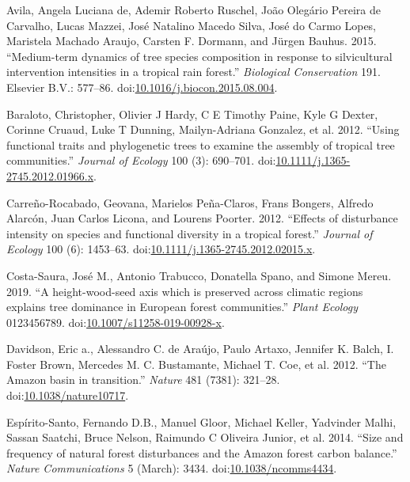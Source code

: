 \documentclass[]{elsarticle} %
\begin{document}
\hypertarget{refs}{}
\hypertarget{ref-DeAvila2015}{}
Avila, Angela Luciana de, Ademir Roberto Ruschel, João Olegário Pereira
de Carvalho, Lucas Mazzei, José Natalino Macedo Silva, José do Carmo
Lopes, Maristela Machado Araujo, Carsten F. Dormann, and Jürgen Bauhus.
2015. ``Medium-term dynamics of tree species composition in response to
silvicultural intervention intensities in a tropical rain forest.''
\emph{Biological Conservation} 191. Elsevier B.V.: 577--86.
doi:\href{https://doi.org/10.1016/j.biocon.2015.08.004}{10.1016/j.biocon.2015.08.004}.

\hypertarget{ref-Baraloto2012a}{}
Baraloto, Christopher, Olivier J Hardy, C E Timothy Paine, Kyle G
Dexter, Corinne Cruaud, Luke T Dunning, Mailyn-Adriana Gonzalez, et al.
2012. ``Using functional traits and phylogenetic trees to examine the
assembly of tropical tree communities.'' \emph{Journal of Ecology} 100
(3): 690--701.
doi:\href{https://doi.org/10.1111/j.1365-2745.2012.01966.x}{10.1111/j.1365-2745.2012.01966.x}.

\hypertarget{ref-Carreno-Rocabado2012}{}
Carreño-Rocabado, Geovana, Marielos Peña-Claros, Frans Bongers, Alfredo
Alarcón, Juan Carlos Licona, and Lourens Poorter. 2012. ``Effects of
disturbance intensity on species and functional diversity in a tropical
forest.'' \emph{Journal of Ecology} 100 (6): 1453--63.
doi:\href{https://doi.org/10.1111/j.1365-2745.2012.02015.x}{10.1111/j.1365-2745.2012.02015.x}.

\hypertarget{ref-Costa-Saura2019}{}
Costa-Saura, José M., Antonio Trabucco, Donatella Spano, and Simone
Mereu. 2019. ``A height-wood-seed axis which is preserved across
climatic regions explains tree dominance in European forest
communities.'' \emph{Plant Ecology} 0123456789.
doi:\href{https://doi.org/10.1007/s11258-019-00928-x}{10.1007/s11258-019-00928-x}.

\hypertarget{ref-Davidson2012}{}
Davidson, Eric a., Alessandro C. de Araújo, Paulo Artaxo, Jennifer K.
Balch, I. Foster Brown, Mercedes M. C. Bustamante, Michael T. Coe, et
al. 2012. ``The Amazon basin in transition.'' \emph{Nature} 481 (7381):
321--28.
doi:\href{https://doi.org/10.1038/nature10717}{10.1038/nature10717}.

\hypertarget{ref-Espirito-Santo2014}{}
Espírito-Santo, Fernando D.B., Manuel Gloor, Michael Keller, Yadvinder
Malhi, Sassan Saatchi, Bruce Nelson, Raimundo C Oliveira Junior, et al.
2014. ``Size and frequency of natural forest disturbances and the Amazon
forest carbon balance.'' \emph{Nature Communications} 5 (March): 3434.
doi:\href{https://doi.org/10.1038/ncomms4434}{10.1038/ncomms4434}.
\end{document}
